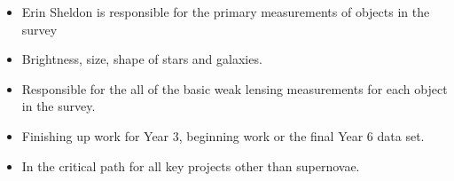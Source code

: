 \documentclass[aspectratio=169]{beamer}
\begin{document}
{\begin{columns}
\begin{column}{0.5\textwidth}
\begin{itemize}
                \item Erin Sheldon is responsible for the primary measurements
                    of objects in the survey

                \item Brightness, size, shape of stars and galaxies.

                \item Responsible for the all of the basic weak lensing measurements
                    for each object in the survey.

                \item Finishing up work for Year 3, beginning work or the final Year 6 data set.

                \item In the critical path for all key projects other than supernovae.

            \end{itemize}

        \end{column}

    \end{columns}


}
\end{document}
